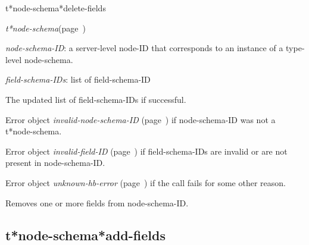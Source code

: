 \begin{description}
\item [Name:]  t*node-schema*delete-fields

\item [Class:] {\sl t*node-schema}\hfill(page~\pageref{t*node-schema})

\item [Parameters:]
\item {\sl node-schema-ID}:  a server-level node-ID that corresponds to an 
instance of a type-level node-schema. 


\item {\sl field-schema-IDs}:  list of field-schema-ID
 

\item [Return-value:]
The updated list of field-schema-IDs if successful.

Error object {\sl invalid-node-schema-ID} (page~\pageref{invalid-node-schema-ID}) if
node-schema-ID was not a t*node-schema.

Error object {\sl invalid-field-ID} (page~\pageref{invalid-field-ID}) if field-schema-IDs 
are invalid or are not present in node-schema-ID.

Error object {\sl unknown-hb-error} (page~\pageref{unknown-hb-error}) if the call fails
for some other reason.

\item [Description:]

Removes one or more fields from node-schema-ID. 

\item [Public:]



\end{description}
\horizontalline

\subsection{t*node-schema*add-fields}
\label{t*node-schema*add-fields}

